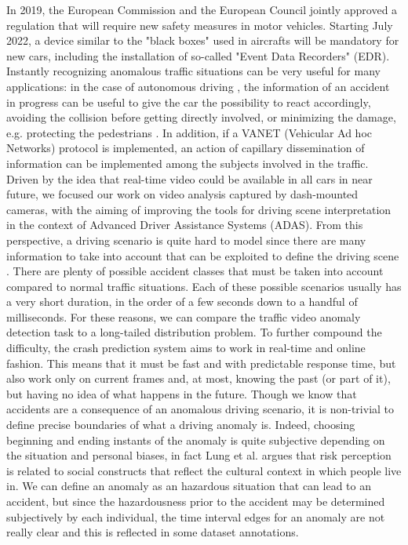 In 2019, the European Commission and the European Council jointly approved a regulation that will require new safety measures in motor vehicles.
Starting July 2022, a device similar to the "black boxes" used in aircrafts will be mandatory for new cars, including the installation of so-called "Event Data Recorders" (EDR).
Instantly recognizing anomalous traffic situations can be very useful for many applications:
in the case of autonomous driving \cite{codevilla2019exploring}, the information of an accident in progress can be useful to give the car the possibility to react accordingly, avoiding the collision before getting directly involved, or minimizing the damage, e.g. protecting the pedestrians \cite{4298901}.
In addition, if a VANET (Vehicular Ad hoc Networks) protocol \cite{fatemidokht2021efficient} is implemented, an action of capillary dissemination of information can be implemented among the subjects involved in the traffic.
Driven by the idea that real-time video could be available in all cars in near future, we focused our work on video analysis captured by dash-mounted cameras, with the aiming of improving the tools for driving scene interpretation in the context of Advanced Driver Assistance Systems (ADAS).
From this perspective, a driving scenario is quite hard to model since there are many information to take into account that can be exploited to define the driving scene  .
There are plenty of possible accident classes that must be taken into account compared to normal traffic situations.
Each of these possible scenarios usually has a very short duration, in the order of a few seconds down to a handful of milliseconds.
For these reasons, we can compare the traffic video anomaly detection task to a long-tailed distribution problem.
To further compound the difficulty, the crash prediction system aims to work in real-time and online fashion.
This means that it must be fast and with predictable response time, but also work only on current frames and, at most, knowing the past (or part of it), but having no idea of what happens in the future.
Though we know that accidents are a consequence of an anomalous driving scenario, it is non-trivial to define precise boundaries of what a driving anomaly is.
Indeed, choosing beginning and ending instants of the anomaly is quite subjective depending on the situation and personal biases, in fact Lung et al. \cite{lund2009riskperception} argues that risk perception is related to social constructs that reflect the cultural context in which people live in.
We can define an anomaly as an hazardous situation that can lead to an accident, but since the hazardousness prior to the accident may be determined subjectively by each individual, the time interval edges for an anomaly are not really clear and this is reflected in some dataset annotations.
